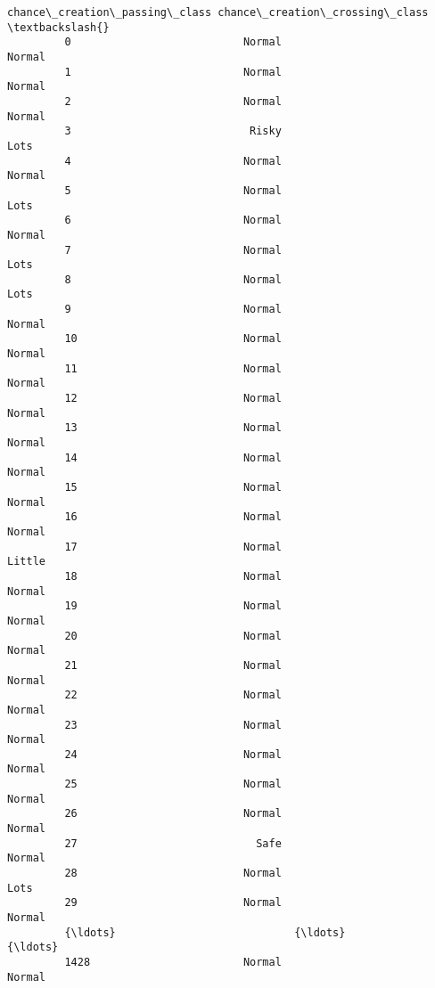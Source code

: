 \documentclass[11pt]{article}
\begin{document}
\begin{Verbatim}[commandchars=\\\{\}]
              chance\_creation\_passing\_class chance\_creation\_crossing\_class  \textbackslash{}
         0                           Normal                         Normal   
         1                           Normal                         Normal   
         2                           Normal                         Normal   
         3                            Risky                           Lots   
         4                           Normal                         Normal   
         5                           Normal                           Lots   
         6                           Normal                         Normal   
         7                           Normal                           Lots   
         8                           Normal                           Lots   
         9                           Normal                         Normal   
         10                          Normal                         Normal   
         11                          Normal                         Normal   
         12                          Normal                         Normal   
         13                          Normal                         Normal   
         14                          Normal                         Normal   
         15                          Normal                         Normal   
         16                          Normal                         Normal   
         17                          Normal                         Little   
         18                          Normal                         Normal   
         19                          Normal                         Normal   
         20                          Normal                         Normal   
         21                          Normal                         Normal   
         22                          Normal                         Normal   
         23                          Normal                         Normal   
         24                          Normal                         Normal   
         25                          Normal                         Normal   
         26                          Normal                         Normal   
         27                            Safe                         Normal   
         28                          Normal                           Lots   
         29                          Normal                         Normal   
         {\ldots}                            {\ldots}                            {\ldots}   
         1428                        Normal                         Normal   

\end{Verbatim}
\end{document}

